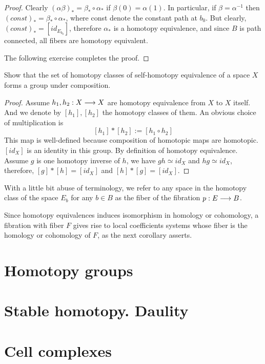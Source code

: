 \documentclass[11pt]{book} %
\begin{document}
\begin{proof}
Clearly $(\alpha\beta)_*=\beta_*\circ \alpha_*$ if $\beta(0)=\alpha(1)$. In particular, if $\beta=\alpha^{-1}$ then $(const)_*=\beta_*\circ \alpha_*$, where const denote the constant path at $b_0$. But clearly, $(const)_*=[id_{E_{b_0}}]$, therefore $\alpha_*$ is a homotopy equivalence, and since $B$ is path connected, all fibers are homotopy equivalent.

The following exercise completes the proof.
\end{proof}
\begin{exr}
Show that the set of homotopy classes of self-homotopy equivalence of a space $X$ forms a group under composition.
\end{exr}
\begin{proof}
Assume $h_1,h_2: X\longrightarrow X$ are homotopy equivalence from $X$ to $X$ itself. And we denote by $[h_1],[h_2]$ the homotopy classes of them. An obvious choice of multiplication is
$$
[h_1]*[h_2]:=[h_1\circ h_2]
$$
This map is well-defined because composition of homotopic maps are homotopic.
$[id_X]$ is an identity in this group. By definition of homotopy equivalence. Assume $g$ is one homotopy inverse of $h$, we have $gh\simeq id_X$ and $hg\simeq id_X$, therefore, $[g]*[h]=[id_X]$ and $[h]*[g]=[id_X]$.
\end{proof}
\begin{definition}
With a little bit abuse of terminology, we refer to any space in the homotopy class of the space $E_b$ for any $b\in B$ as the fiber of the fibration $p: E\longrightarrow B$.
\end{definition}

Since homotopy equivalences induces isomorphism in homology or cohomology, a fibration with fiber $F$ gives rise to local coefficients systems whose fiber is the homology or cohomology of $F$, as the next corollary asserts.

\begin{corollary}

\end{corollary}
\chapter{Homotopy groups}
\chapter{Stable homotopy. Daulity}
\chapter{Cell complexes}
\end{document}

